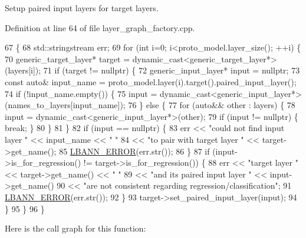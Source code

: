 Setup paired input layers for target layers. 

Definition at line 64 of file layer\+\_\+graph\+\_\+factory.\+cpp.


\begin{DoxyCode}
67                                                                \{
68   std::stringstream err;
69   \textcolor{keywordflow}{for} (\textcolor{keywordtype}{int} i=0; i<proto\_model.layer\_size(); ++i) \{
70     generic\_target\_layer* target = \textcolor{keyword}{dynamic\_cast<}generic\_target\_layer*\textcolor{keyword}{>}(layers[i]);
71     \textcolor{keywordflow}{if} (target != \textcolor{keyword}{nullptr}) \{
72       generic\_input\_layer* input = \textcolor{keyword}{nullptr};
73       \textcolor{keyword}{const} \textcolor{keyword}{auto}& input\_name = proto\_model.layer(i).target().paired\_input\_layer();
74       \textcolor{keywordflow}{if} (!input\_name.empty()) \{
75         input = \textcolor{keyword}{dynamic\_cast<}generic\_input\_layer*\textcolor{keyword}{>}(names\_to\_layers[input\_name]);
76       \} \textcolor{keywordflow}{else} \{
77         \textcolor{keywordflow}{for} (\textcolor{keyword}{auto}&& other : layers) \{
78           input = \textcolor{keyword}{dynamic\_cast<}generic\_input\_layer*\textcolor{keyword}{>}(other);
79           \textcolor{keywordflow}{if} (input != \textcolor{keyword}{nullptr}) \{ \textcolor{keywordflow}{break}; \}
80         \}
81       \}
82       \textcolor{keywordflow}{if} (input == \textcolor{keyword}{nullptr}) \{
83         err << \textcolor{stringliteral}{"could not find input layer "} << input\_name << \textcolor{stringliteral}{" "}
84             << \textcolor{stringliteral}{"to pair with target layer "} << target->get\_name();
85         \hyperlink{base_8hpp_a80b1d707117e968a6951b7222e4b2b87}{LBANN\_ERROR}(err.str());
86       \}
87       \textcolor{keywordflow}{if} (input->is\_for\_regression() != target->is\_for\_regression()) \{
88         err << \textcolor{stringliteral}{"target layer "} << target->get\_name() << \textcolor{stringliteral}{" "}
89             << \textcolor{stringliteral}{"and its paired input layer "} << input->get\_name()
90             << \textcolor{stringliteral}{"are not consistent regarding regression/classification"};
91         \hyperlink{base_8hpp_a80b1d707117e968a6951b7222e4b2b87}{LBANN\_ERROR}(err.str());
92       \}
93       target->set\_paired\_input\_layer(input);
94     \}
95   \}
96 \}
\end{DoxyCode}
Here is the call graph for this function\+:\nopagebreak
